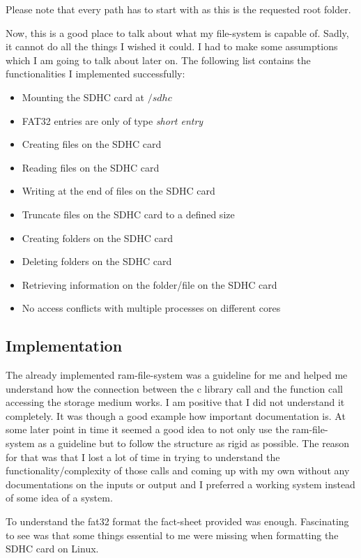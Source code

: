Please note that every path has to start with  as this is the requested root folder.

Now, this is a good place to talk about what my file-system is capable of. Sadly, it cannot do all the things I wished it could. I had to make some assumptions which I am going to talk about later on. The following list contains the functionalities I implemented successfully:

\begin{itemize}
\item Mounting the SDHC card at $/sdhc$
\item FAT32 entries are only of type \emph{short entry}
\item Creating files on the SDHC card
\item Reading files on the SDHC card
\item Writing at the end of files on the SDHC card
\item Truncate files on the SDHC card to a defined size
\item Creating folders on the SDHC card
\item Deleting folders on the SDHC card
\item Retrieving information on the folder/file on the SDHC card
\item No access conflicts with multiple processes on different cores
\end{itemize}

\subsection{Implementation}
The already implemented ram-file-system was a guideline for me and helped me understand how the connection between the c library call and the function call accessing the storage medium works. I am positive that I did not understand it completely. It was though a good example how important documentation is. 
At some later point in time it seemed a good idea to not only use the ram-file-system as a guideline but to follow the structure as rigid as possible. The reason for that was that I lost a lot of time in trying to understand the functionality/complexity of those calls and coming up with my own without any documentations on the inputs or output and I preferred a working system instead of some idea of a system.

To understand the fat32 format the fact-sheet provided was enough. Fascinating to see was that some things essential to me were missing when formatting the SDHC card on Linux. 

